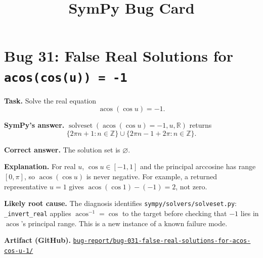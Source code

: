 \documentclass[11pt]{article}
\title{SymPy Bug Card}
\date{}
\newcommand{\artifactrepo}{https://github.com/TODO-org/TODO-repo}
\newcommand{\bugbundle}[1]{\href{\artifactrepo/tree/main/bug-report/#1}{\nolinkurl{bug-report/#1/}}}
\begin{document}
\author{}
\maketitle

\section*{Bug 31: False Real Solutions for \texttt{acos(cos(u)) = -1}}

\begin{counterexamplebox}
\textbf{Task.} Solve the real equation
\[
  \operatorname{acos}(\cos u) = -1.
\]

\medskip
\textbf{SymPy's answer.} \(\operatorname{solveset}(\operatorname{acos}(\cos u)=-1,u,\mathbb{R})\)
returns
\[
  \{2\pi n+1:n\in\mathbb{Z}\}\cup
  \{2\pi n-1+2\pi:n\in\mathbb{Z}\}.
\]

\medskip
\textbf{Correct answer.} The solution set is \(\varnothing\).

\medskip
\textbf{Explanation.} For real \(u\), \(\cos u\in[-1,1]\) and the principal
arccosine has range \([0,\pi]\), so \(\operatorname{acos}(\cos u)\) is never negative.
For example, a returned representative \(u=1\) gives
\(\operatorname{acos}(\cos 1)-(-1)=2\), not zero.

\medskip
\textbf{Likely root cause.} The diagnosis identifies
\nolinkurl{sympy/solvers/solveset.py}: \texttt{\_invert\_real} applies
\(\operatorname{acos}^{-1}=\cos\) to the target before checking that \(-1\) lies in
\(\operatorname{acos}\)'s principal range.  This is a new instance of a known failure mode.

\medskip
\textbf{Artifact (GitHub).} \bugbundle{bug-031-false-real-solutions-for-acos-cos-u-1}
\end{counterexamplebox}
\end{document}
